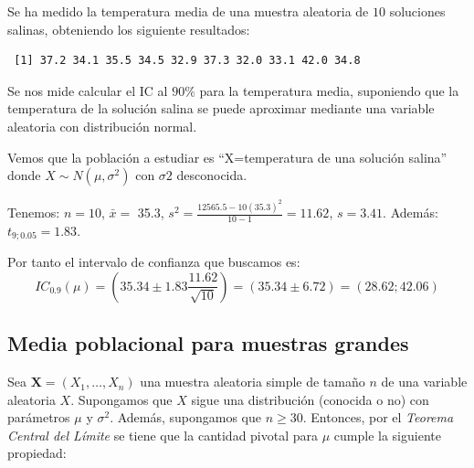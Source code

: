 \documentclass[
  letterpaper,
  DIV=11,
  numbers=noendperiod]{scrreprt}
\begin{document}
\begin{tcolorbox}[enhanced jigsaw, arc=.35mm, breakable, coltitle=black, left=2mm, opacityback=0, bottomtitle=1mm, colbacktitle=quarto-callout-tip-color!10!white, title=\textcolor{quarto-callout-tip-color}{\faLightbulb}\hspace{0.5em}{Ejemplo. Intervalo de confianza para la media de una distribución normal
con varianza desconocida}, titlerule=0mm, colback=white, colframe=quarto-callout-tip-color-frame, bottomrule=.15mm, rightrule=.15mm, opacitybacktitle=0.6, toptitle=1mm, toprule=.15mm, leftrule=.75mm]

Se ha medido la temperatura media de una muestra aleatoria de \(10\)
soluciones salinas, obteniendo los siguiente resultados:

\begin{verbatim}
 [1] 37.2 34.1 35.5 34.5 32.9 37.3 32.0 33.1 42.0 34.8
\end{verbatim}

Se nos mide calcular el IC al \(90\%\) para la temperatura media,
suponiendo que la temperatura de la solución salina se puede aproximar
mediante una variable aleatoria con distribución normal.

Vemos que la población a estudiar es ``X=temperatura de una solución
salina'' donde \(X \sim N(\mu,\sigma^2)\) con \(\sigma 2\) desconocida.

Tenemos: \(n=10\), \(\bar{x}=\) 35.3,
\(s^2=\frac{12565.5-10(35.3)^2}{10-1}=11.62\), \(s=3.41\). Además:
\(t_{9;0.05}=1.83\).

Por tanto el intervalo de confianza que buscamos es: \[
IC_{0.9}(\mu)=\left (35.34\pm 1.83\frac{11.62}{\sqrt{10}} \right )=(35.34\pm6.72)=(28.62;42.06)
\]

\end{tcolorbox}

\hypertarget{media-poblacional-para-muestras-grandes}{%
\subsection{Media poblacional para muestras
grandes}\label{media-poblacional-para-muestras-grandes}}

Sea \(\mathbf{X}=(X_1,\ldots,X_n)\) una muestra aleatoria simple de
tamaño \(n\) de una variable aleatoria \(X\). Supongamos que \(X\) sigue
una distribución (conocida o no) con parámetros \(\mu\) y \(\sigma^2\).
Además, supongamos que \(n \geq 30\). Entonces, por el \emph{Teorema
Central del Límite} se tiene que la cantidad pivotal para \(\mu\) cumple
la siguiente propiedad:
\end{document}
